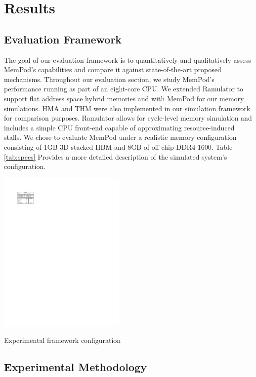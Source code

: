 \section{Results}
\label{sec:Results}

\subsection{Evaluation Framework}
\label{sub:Evaluation}

The goal of our evaluation framework is to quantitatively and qualitatively assess MemPod's capabilities and compare it against state-of-the-art proposed mechanisms. Throughout our evaluation section, we study MemPod's performance running as part of an eight-core CPU. We extended Ramulator \cite{kim-ramulator} to support flat address space hybrid memories and with MemPod for our memory simulations. HMA and THM were also implemented in our simulation framework for comparison purposes. Ramulator allows for cycle-level memory simulation and includes a simple CPU front-end capable of approximating resource-induced stalls. We chose to evaluate MemPod under a realistic memory configuration consisting of 1GB 3D-stacked HBM \cite{JEDEC-HBM-REVISED} and 8GB of off-chip DDR4-1600. Table \ref{tab:specs} Provides a more detailed description of the simulated system's configuration.

\begin{table}[t]
  \includegraphics[width=0.46\textwidth]{figures/specs_table.pdf}
  \caption{Experimental framework configuration}
  \label{tab:specs}
\end{table}

\subsection{Experimental Methodology}
\label{sub:Experimental}

